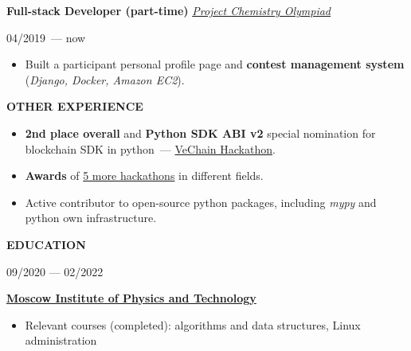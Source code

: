 \documentclass[10pt]{article}
\newcommand{\cvrsect}[1]{
    \begin{tcolorbox}[
            sharp corners,
            enhanced,
            colback=rightSectionTitle,
            colframe=rightSectionTitle,
            coltext=leftBackground,
            left=0.5cm,
            right=0.5cm,
            bottom=4pt,
            top=4pt,
            width=\linewidth+8.5px,
            enlarge left by=-8.5px,
            fontupper=\large]
        \MakeUppercase{\textbf{#1}}
    \end{tcolorbox}
    \vspace*{-0.5\baselineskip+0.75em}
}
\def\leftcolumnwidth{0.3\textwidth}
\begin{document}
\begin{minipage}[t]{\textwidth - \leftcolumnwidth - 6pt}
    \vspace{1em}

    \textbf{Full-stack Developer (part-time)}
    \hfill
    \textit{\href{https://chemolymp.ru/}{Project Chemistry Olympiad}}

    \vspace{1em}

    \begin{minipage}{0.25\textwidth}
        04/2019~--- now
    \end{minipage}
    \begin{minipage}{0.75\textwidth}

        \begin{itemize}[topsep=4pt,parsep=0pt,leftmargin=*]
            \item
            \raggedright
            Built a participant personal profile page and \textbf{contest management system} (\textit{Django, Docker, Amazon EC2}).
        \end{itemize}
    \end{minipage}

    \cvrsect{Other experience}
    \vspace{-1em}
    \begin{itemize}
        \setlength\itemsep{0em}
        \item
        \raggedright
        \textbf{2nd place overall} and \textbf{Python SDK ABI v2} special nomination for blockchain SDK in python~--- \href{https://devpost.com/software/thor-devkit-py}{VeChain Hackathon}.

        \item
        \raggedright
        \textbf{Awards} of \href{https://devpost.com/sterliakov}{5 more hackathons} in different fields.

        \item
        \raggedright
        Active contributor to open-source python packages, including \textit{mypy} and python own infrastructure.
    \end{itemize}

    \cvrsect{Education}
    \begin{minipage}{0.25\textwidth}
        09/2020 --- 02/2022
    \end{minipage}
    \begin{minipage}{0.75\textwidth}
        \textbf{\href{https://mipt.ru/english/}{Moscow Institute of Physics and Technology}}

        \begin{itemize}[topsep=4pt,parsep=1pt,leftmargin=*]
            \item
            Relevant courses (completed): algorithms and data structures, Linux administration


\end{itemize}
\end{minipage}
\end{minipage}
\end{document}
